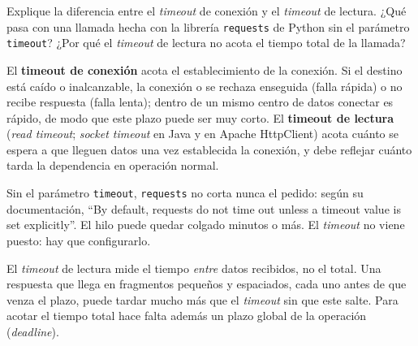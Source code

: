 \documentclass[variant=guia,cover=institutional,mode=screen]{ua-engineering-v6-article}
\begin{document}
\begin{uaexercise}
Explique la diferencia entre el \emph{timeout} de conexión y el \emph{timeout} de lectura. ¿Qué pasa con una llamada hecha con la librería \texttt{requests} de Python sin el parámetro \texttt{timeout}? ¿Por qué el \emph{timeout} de lectura no acota el tiempo total de la llamada?
\end{uaexercise}
\begin{uaanswer}
El \textbf{timeout de conexión} acota el establecimiento de la conexión. Si el destino está caído o inalcanzable, la conexión o se rechaza enseguida (falla rápida) o no recibe respuesta (falla lenta); dentro de un mismo centro de datos conectar es rápido, de modo que este plazo puede ser muy corto. El \textbf{timeout de lectura} (\emph{read timeout}; \emph{socket timeout} en Java y en Apache HttpClient) acota cuánto se espera a que lleguen datos una vez establecida la conexión, y debe reflejar cuánto tarda la dependencia en operación normal.

Sin el parámetro \texttt{timeout}, \texttt{requests} no corta nunca el pedido: según su documentación, ``By default, requests do not time out unless a timeout value is set explicitly''. El hilo puede quedar colgado minutos o más. El \emph{timeout} no viene puesto: hay que configurarlo.

El \emph{timeout} de lectura mide el tiempo \emph{entre} datos recibidos, no el total. Una respuesta que llega en fragmentos pequeños y espaciados, cada uno antes de que venza el plazo, puede tardar mucho más que el \emph{timeout} sin que este salte. Para acotar el tiempo total hace falta además un plazo global de la operación (\emph{deadline}).
\end{uaanswer}
\end{document}
